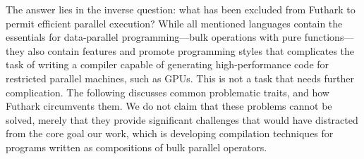 The answer lies in the inverse question: what has been excluded from
Futhark to permit efficient parallel execution?  While all mentioned
languages contain the essentials for data-parallel programming---bulk
operations with pure functions---they also contain features and
promote programming styles that complicates the task of writing a
compiler capable of generating high-performance code for restricted
parallel machines, such as GPUs.  This is not a task that needs
further complication.  The following discusses common problematic
traits, and how Futhark circumvents them.  We do not claim that these
problems cannot be solved, merely that they provide significant
challenges that would have distracted from the core goal our work,
which is developing compilation techniques for programs written as
compositions of bulk parallel operators.

